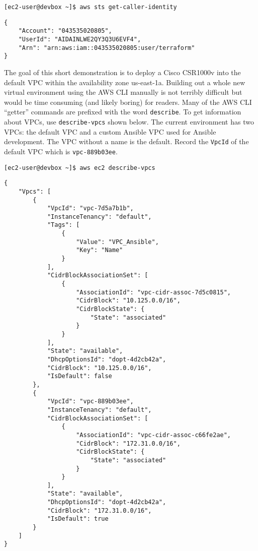 \begin{verbatim}
[ec2-user@devbox ~]$ aws sts get-caller-identity
\end{verbatim}

\begin{verbatim}
{
    "Account": "043535020805", 
    "UserId": "AIDAINLWE2QY3Q3U6EVF4", 
    "Arn": "arn:aws:iam::043535020805:user/terraform"
}
\end{verbatim}

The goal of this short demonstration is to deploy a Cisco CSR1000v into the
default VPC within the availability zone us-east-1a. Building out a whole new
virtual environment using the AWS CLI manually is not terribly difficult but
would be time consuming (and likely boring) for readers. Many of the AWS CLI
``getter'' commands are prefixed with the word \verb|describe|. To get information
about VPCs, use \verb|describe-vpcs| shown below. The current environment has two
VPCs: the default VPC and a custom Ansible VPC used for Ansible development.
The VPC without a name is the default. Record the \verb|VpcId| of the default VPC
which is \verb|vpc-889b03ee|.

\begin{verbatim}
[ec2-user@devbox ~]$ aws ec2 describe-vpcs
\end{verbatim}

\begin{verbatim}
{
    "Vpcs": [
        {
            "VpcId": "vpc-7d5a7b1b", 
            "InstanceTenancy": "default", 
            "Tags": [
                {
                    "Value": "VPC_Ansible", 
                    "Key": "Name"
                }
            ], 
            "CidrBlockAssociationSet": [
                {
                    "AssociationId": "vpc-cidr-assoc-7d5c0815", 
                    "CidrBlock": "10.125.0.0/16", 
                    "CidrBlockState": {
                        "State": "associated"
                    }
                }
            ], 
            "State": "available", 
            "DhcpOptionsId": "dopt-4d2cb42a", 
            "CidrBlock": "10.125.0.0/16", 
            "IsDefault": false
        }, 
        {
            "VpcId": "vpc-889b03ee", 
            "InstanceTenancy": "default", 
            "CidrBlockAssociationSet": [
                {
                    "AssociationId": "vpc-cidr-assoc-c66fe2ae", 
                    "CidrBlock": "172.31.0.0/16", 
                    "CidrBlockState": {
                        "State": "associated"
                    }
                }
            ], 
            "State": "available", 
            "DhcpOptionsId": "dopt-4d2cb42a", 
            "CidrBlock": "172.31.0.0/16", 
            "IsDefault": true
        }
    ]
}
\end{verbatim}

